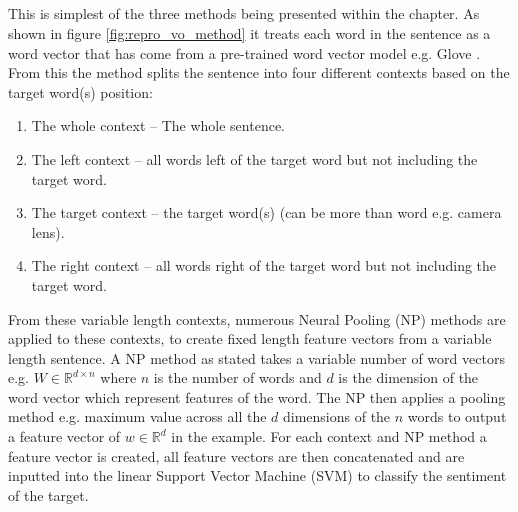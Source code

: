 \subsection{\cite{vo2015target}}
This is simplest of the three methods being presented within the chapter. As shown in figure \ref{fig:repro_vo_method} it treats each word in the sentence as a word vector that has come from a pre-trained word vector model e.g. Glove \citep{pennington-etal-2014-glove}. From this the method splits the sentence into four different contexts based on the target word(s) position:
\begin{enumerate}
    \item The whole context -- The whole sentence.
    \item The left context -- all words left of the target word but not including the target word.
    \item The target context -- the target word(s) (can be more than word e.g. camera lens).
    \item The right context -- all words right of the target word but not including the target word.
\end{enumerate}
From these variable length contexts, numerous Neural Pooling (NP) methods are applied to these contexts, to create fixed length feature vectors from a variable length sentence. A NP method as stated takes a variable number of word vectors e.g. $W \in  \mathbb{R}^{d\times n}$ where $n$ is the number of words and $d$ is the dimension of the word vector which represent features of the word. The NP then applies a pooling method e.g. maximum value across all the $d$ dimensions of the $n$ words to output a feature vector of $w \in \mathbb{R}^{d}$ in the example. For each context and NP method a feature vector is created, all feature vectors are then concatenated and are inputted into the linear Support Vector Machine (SVM) to classify the sentiment of the target.\\
\\

